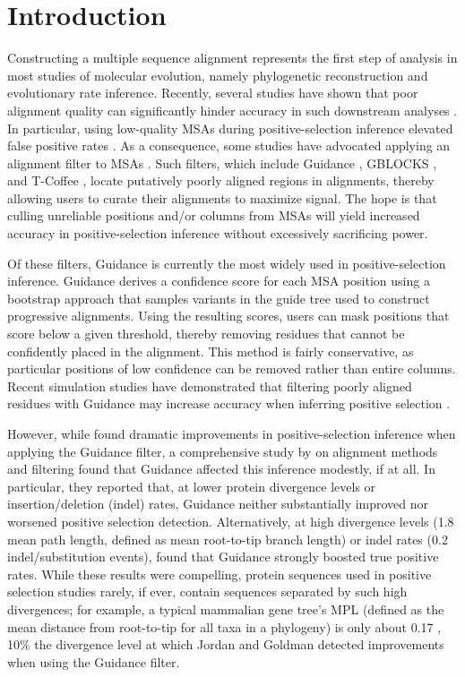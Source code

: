 \documentclass[10pt]{article}
\begin{document}
\section*{Introduction}
Constructing a multiple sequence alignment represents the first step of analysis in most studies of molecular evolution, namely phylogenetic reconstruction and evolutionary rate inference. Recently, several studies have shown that poor alignment quality can significantly hinder accuracy in such downstream analyses \citep{Jordan2012, MarkovaRaina2011, Dwivedi2009, Talavera2007, Ogden2006}. In particular, using low-quality MSAs during positive-selection inference elevated false positive rates \citep{Schneider2009, Fletcher2010, MarkovaRaina2011}. As a consequence, some studies have advocated applying an alignment filter to MSAs \citep{Jordan2012, Privman2012}. Such filters, which include Guidance \citep{Penn2010, Privman2012}, GBLOCKS \citep{Castresana2000}, and T-Coffee \citep{Notredame2000}, locate putatively poorly aligned regions in alignments, thereby allowing users to curate their alignments to maximize signal. The hope is that culling unreliable positions and/or columns from MSAs will yield increased accuracy in positive-selection inference without excessively sacrificing power.

Of these filters, Guidance \citep{Penn2010} is currently the most widely used in positive-selection inference. Guidance derives a confidence score for each MSA position using a bootstrap approach that samples variants in the guide tree used to construct progressive alignments. Using the resulting scores, users can mask positions that score below a given threshold, thereby removing residues that cannot be confidently placed in the alignment. This method is fairly conservative, as particular positions of low confidence can be removed rather than entire columns. Recent simulation studies have demonstrated that filtering poorly aligned residues with Guidance may increase accuracy when inferring positive selection \citep{Jordan2012,Privman2012}. 

However, while \citet{Privman2012} found dramatic improvements in positive-selection inference when applying the Guidance filter, a comprehensive study by \citet{Jordan2012} on alignment methods and filtering found that Guidance affected this inference modestly, if at all. In particular, they reported that, at lower protein divergence levels or insertion/deletion (indel) rates, Guidance neither substantially improved nor worsened positive selection detection. Alternatively, at high divergence levels (1.8 mean path length, defined as mean root-to-tip branch length) or indel rates (0.2 indel/substitution events), \citet{Jordan2012} found that Guidance strongly boosted true positive rates. While these results were compelling, protein sequences used in positive selection studies rarely, if ever, contain sequences separated by such high divergences; for example, a typical mammalian gene tree's MPL (defined as the mean distance from root-to-tip for all taxa in a phylogeny) is only about 0.17 \citep{Spielman2013}, 10\% the divergence level at which Jordan and Goldman detected improvements when using the Guidance filter.
\end{document}
